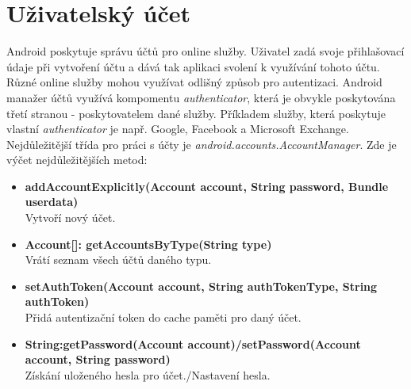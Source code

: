 \documentclass{diplomka}
\begin{document}
\section{Uživatelský účet}
Android poskytuje správu účtů pro online služby. Uživatel zadá svoje přihlašovací údaje při vytvoření účtu a dává tak aplikaci svolení k využívání tohoto účtu.\\ \indent
Různé online služby mohou využívat odlišný způsob pro autentizaci. Android manažer účtů využívá kompomentu \emph{authenticator}\cite{accman}, která je obvykle poskytována třetí stranou - poskytovatelem dané služby. Příkladem služby, která poskytuje vlastní \emph{authenticator} je např. Google, Facebook a Microsoft Exchange.\\ \indent
Nejdůležitější třída pro práci s účty je \emph{	android.accounts.AccountManager}. Zde je výčet nejdůležitějších metod:
\begin{itemize}[]
\item \textbf{addAccountExplicitly(Account account, String password, Bundle userdata)}\\
Vytvoří nový účet.
\item \textbf{Account[]: getAccountsByType(String type)}\\
Vrátí seznam všech účtů daného typu.
\item \textbf{setAuthToken(Account account, String authTokenType, String authToken)}\\
Přidá autentizační token do cache paměti pro daný účet.
\item \textbf{String:getPassword(Account account)/setPassword(Account account, String password)}\\
Získání uloženého hesla pro účet./Nastavení hesla.
\end{itemize}
\end{document}

